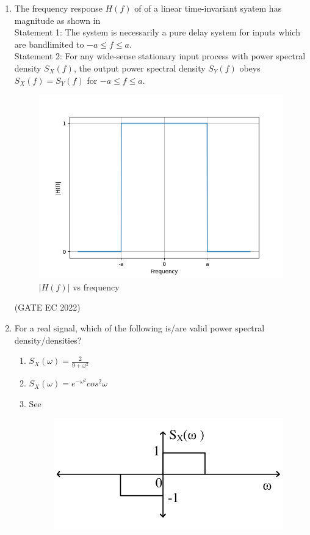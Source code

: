 \begin{enumerate}[label=\thechapter.\arabic*,ref=\thechapter.\theenumi]
\item The frequency response $H(f)$ of of a linear time-invariant syatem has magnitude as shown in \\
Statement 1: The system is necessarily a pure delay system for inputs which are bandlimited to $-a \leq f \leq a$.\\
Statement 2: For any wide-sense stationary input process with power spectral density $S_X(f)$, the output power spectral density $S_Y(f)$ obeys $S_X(f)=S_Y(f)$ for $-a \leq f \leq a$.\\
\begin{figure}[!ht]
\centering
\includegraphics[width=\columnwidth]{gate/EC/2022/23/figs/figure.png}
\caption{$|H(f)|$ vs frequency}
\end{figure}
\label{fig:23,2022}
\hfill (GATE EC 2022)\\

\item For a real signal, which of the following is/are valid power spectral density/densities?
\begin{enumerate}
\item \label{eq:30/2023/1}$S_X(\omega)=\frac{2}{9+\omega^2}$\\
\item \label{eq:30/2023/2}$S_X(\omega)=e^{-\omega^2}cos^2{\omega}$
\item See 
\begin{figure}[ht]
	\centering
	\includegraphics[width=\columnwidth]{gate/EC/2022/30/figs/fig1.png}

\end{figure}
\end{enumerate}
\end{enumerate}
